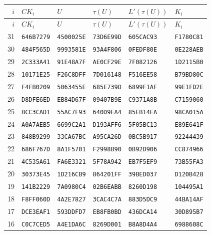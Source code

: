 \begingroup\small
\begin{longtable}{rlllll}
\toprule
$i$ & $CK_i$ & $U$ & $\tau(U)$ & $L'(\tau(U))$ & $K_i$\\
\midrule
\endfirsthead
\toprule
$i$ & $CK_i$ & $U$ & $\tau(U)$ & $L'(\tau(U))$ & $K_i$\\
\midrule
\endhead
31 & \texttt{646B7279} & \texttt{4500025E} & \texttt{73D6E99D} & \texttt{605CAC93} & \texttt{F1780C81}\\
30 & \texttt{484F565D} & \texttt{9993581E} & \texttt{93A4F806} & \texttt{0FEDF80E} & \texttt{0E228AEB}\\
29 & \texttt{2C333A41} & \texttt{91E48A7F} & \texttt{AE0CF29E} & \texttt{7F082126} & \texttt{1D2115B0}\\
28 & \texttt{10171E25} & \texttt{F26C8DFF} & \texttt{7D016148} & \texttt{F516EE58} & \texttt{B79BD80C}\\
27 & \texttt{F4FB0209} & \texttt{5063455E} & \texttt{685E739D} & \texttt{6899F1AF} & \texttt{99E1FD2E}\\
26 & \texttt{D8DFE6ED} & \texttt{EB84D67F} & \texttt{09407B9E} & \texttt{C9371A8B} & \texttt{C7159060}\\
25 & \texttt{BCC3CAD1} & \texttt{55AC7F93} & \texttt{640D9EA4} & \texttt{85EB14EA} & \texttt{98CA015A}\\
24 & \texttt{A0A7AEB5} & \texttt{6699C2A1} & \texttt{D193AFF6} & \texttt{5F05BC13} & \texttt{E89E641F}\\
23 & \texttt{848B9299} & \texttt{33CA67BC} & \texttt{A95CA26D} & \texttt{0BC5B917} & \texttt{92244439}\\
22 & \texttt{686F767D} & \texttt{8A1F5701} & \texttt{F2998B90} & \texttt{0B92D906} & \texttt{CC874966}\\
21 & \texttt{4C535A61} & \texttt{FA6E3321} & \texttt{5F78A942} & \texttt{EB7F5EF9} & \texttt{73B55FA3}\\
20 & \texttt{30373E45} & \texttt{1D216CB9} & \texttt{864201FF} & \texttt{39BED037} & \texttt{D120B428}\\
19 & \texttt{141B2229} & \texttt{7A0980C4} & \texttt{02B6EABB} & \texttt{8260D198} & \texttt{104495A1}\\
18 & \texttt{F8FF060D} & \texttt{4A2E7827} & \texttt{3CAC4C7A} & \texttt{883D5DC9} & \texttt{44BA14AF}\\
17 & \texttt{DCE3EAF1} & \texttt{593DDFD7} & \texttt{EB8FB0BD} & \texttt{436DCA14} & \texttt{30D895B7}\\
16 & \texttt{C0C7CED5} & \texttt{A4E1DA6C} & \texttt{8269D001} & \texttt{B8A8D4A4} & \texttt{6988608C}\\

\end{longtable}
